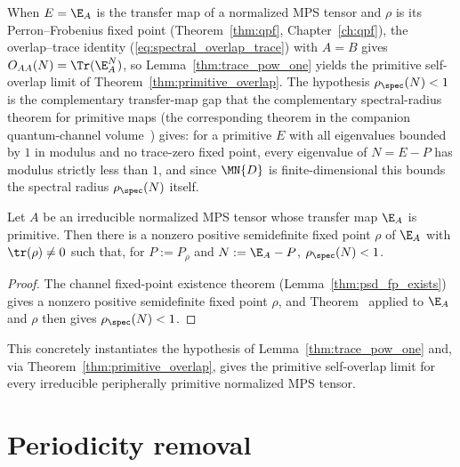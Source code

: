 When $E=\E_A$ is the transfer map of a normalized MPS tensor and $\rho$ is
its Perron--Frobenius fixed point (Theorem~\ref{thm:qpf},
Chapter~\ref{ch:qpf}), the overlap--trace identity
(\ref{eq:spectral_overlap_trace}) with $A=B$ gives
$O_{AA}(N)=\Tr(\E_A^N)$, so Lemma~\ref{thm:trace_pow_one} yields the
primitive self-overlap limit of Theorem~\ref{thm:primitive_overlap}. The
hypothesis $\rho_{\spec}(N)<1$ is the complementary transfer-map gap
that the complementary spectral-radius theorem for primitive maps
(the corresponding theorem in the companion quantum-channel volume~\cite[``Complementary transfer-map gap for primitive maps'']{QICLean2026Blueprint})
gives: for a primitive $E$ with all eigenvalues bounded by $1$ in modulus and
no trace-zero fixed point, every eigenvalue of $N=E-P$ has modulus strictly
less than $1$, and since $\MN{D}$ is finite-dimensional this bounds the
spectral radius $\rho_{\spec}(N)$ itself.


\begin{lemma}%
    \label{thm:spectralRadius_compl_lt_one_peripheralPrimitive_irred}
    \leanok
    Let $A$ be an irreducible normalized MPS tensor whose transfer map
    $\E_A$ is primitive. Then there is a nonzero positive semidefinite
    fixed point $\rho$ of $\E_A$ with $\tr(\rho)\neq0$ such that, for
    $P:=P_\rho$ and $N:=\E_A-P$, $\rho_{\spec}(N)<1$.
\end{lemma}

\begin{proof}\leanok
    The channel fixed-point existence theorem
    (Lemma~\ref{thm:psd_fp_exists}) gives a nonzero positive
    semidefinite fixed point $\rho$, and
    Theorem~\cite[``Complementary gap at a prescribed fixed point'']{QICLean2026Blueprint}
    applied to $\E_A$ and $\rho$ then gives $\rho_{\spec}(N)<1$.
\end{proof}

This concretely instantiates the hypothesis of
Lemma~\ref{thm:trace_pow_one} and, via Theorem~\ref{thm:primitive_overlap},
gives the primitive self-overlap limit for every irreducible peripherally
primitive normalized MPS tensor.

\section{Periodicity removal}
\label{sec:app_spectral_periodicity}

